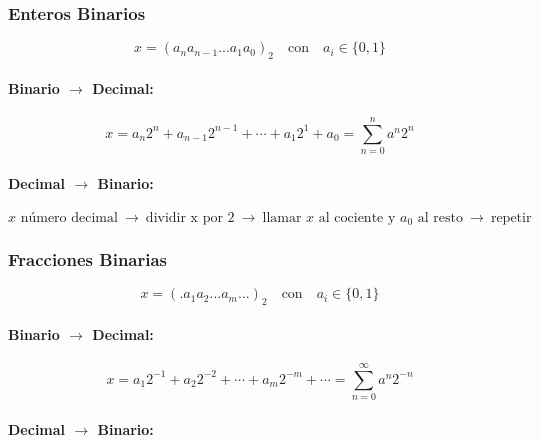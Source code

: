 \hypertarget{enteros-binarios}{%
\subsubsection{Enteros Binarios}\label{enteros-binarios}}

\[
x = (a_n a_{n-1} ... a_1 a_0)_2 \quad\text{con}\quad a_i \in \{0,1\}
\]

\hypertarget{binario-rightarrow-decimal}{%
\paragraph{\texorpdfstring{Binario \(\rightarrow\)
Decimal:}{Binario \textbackslash{}rightarrow Decimal:}}\label{binario-rightarrow-decimal}}

\[
x = a_n 2^n + a_{n-1} 2^{n-1} + \cdots + a_1 2^1 + a_0 = \sum_{n=0}^n a^n 2^n
\]

\hypertarget{decimal-rightarrow-binario}{%
\paragraph{\texorpdfstring{Decimal \(\rightarrow\)
Binario:}{Decimal \textbackslash{}rightarrow Binario:}}\label{decimal-rightarrow-binario}}

\[
\text{$x$ número decimal} \  \rightarrow \
\text{dividir x por 2} \  \rightarrow \
\text{llamar $x$ al cociente y $a_0$ al resto} \  \rightarrow \
\text{repetir}
\]

\hypertarget{fracciones-binarias}{%
\subsubsection{Fracciones Binarias}\label{fracciones-binarias}}

\[
x = (.a_1 a_2 ... a_m ...)_2 \quad\text{con}\quad a_i \in \{0,1\}
\]

\hypertarget{binario-rightarrow-decimal-1}{%
\paragraph{\texorpdfstring{Binario \(\rightarrow\)
Decimal:}{Binario \textbackslash{}rightarrow Decimal:}}\label{binario-rightarrow-decimal-1}}

\[
x = a_1 2^{-1} + a_2 2^{-2} + \cdots + a_m 2^{-m} + \cdots 
= \sum_{n=0}^\infty a^n 2^{-n}
\]

\hypertarget{decimal-rightarrow-binario-1}{%
\paragraph{\texorpdfstring{Decimal \(\rightarrow\)
Binario:}{Decimal \textbackslash{}rightarrow Binario:}}\label{decimal-rightarrow-binario-1}}

